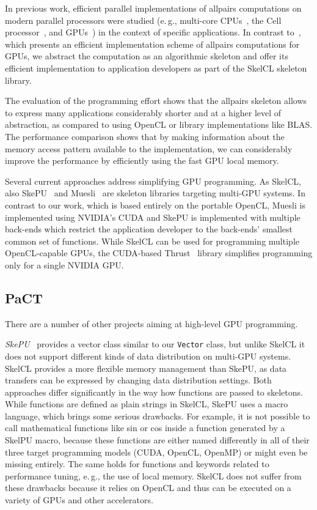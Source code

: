 In previous work, efficient parallel implementations of allpairs computations on modern parallel processors were studied (e.\,g., multi-core CPUs~\cite{AroraShVu2009}, the Cell processor~\cite{WirawanSK09}, and GPUs~\cite{ChangDeQuRo2009}) in the context of specific applications.
In contrast to~\cite{SarjeAl2013}, which presents an efficient implementation scheme of allpairs computations for GPUs, we abstract the computation as an algorithmic skeleton and offer its efficient implementation to application developers as part of the SkelCL skeleton library.

The evaluation of the programming effort shows that the allpairs skeleton allows to express many applications considerably shorter and at a higher level of abstraction, as compared to using OpenCL or library implementations like BLAS.
The performance comparison shows that by making information about the memory access pattern available to the implementation, we can considerably improve the performance by efficiently using the fast GPU local memory.

Several current approaches address simplifying GPU programming.
As SkelCL, also SkePU~\cite{EnmyrenKe10} and Muesli~\cite{ErK-12} are skeleton libraries targeting multi-GPU systems.
In contrast to our work, which is based entirely on the portable OpenCL, Muesli is implemented using NVIDIA's CUDA and SkePU is implemented with multiple back-ends which restrict the application developer to the back-ends' smallest common set of functions.
While SkelCL can be used for programming multiple OpenCL-capable GPUs, the CUDA-based Thrust~\cite{BellHo2011} library simplifies programming only for a single NVIDIA GPU.

\subsection{PaCT}
There are a number of other projects aiming at high-level GPU programming.

\emph{SkePU}~\cite{EnmyrenKe10} provides a vector class similar to our \texttt{Vector} class, but unlike SkelCL it does not support different kinds of data distribution on multi-GPU systems.
SkelCL provides a more flexible memory management than SkePU, as data transfers can be expressed by changing data distribution settings.
Both approaches differ significantly in the way how functions are passed to skeletons.
While functions are defined as plain strings in SkelCL, SkePU uses a macro language, which brings some serious drawbacks.
For example, it is not possible to call mathematical functions like sin or cos inside a function generated by a SkelPU macro,
because these functions are either named differently in all of their three target programming models (CUDA, OpenCL, OpenMP) or might even be missing entirely.
The same holds for functions and keywords related to performance tuning, e.\,g., the use of local memory.
SkelCL does not suffer from these drawbacks because it relies on OpenCL and thus can be executed on a variety of GPUs and other accelerators.

